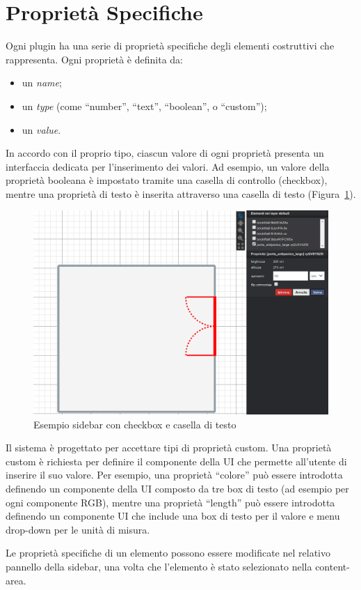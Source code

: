 \section{Propriet\`a Specifiche}
\label{sec:chapter_3_section_3}

\noindent

Ogni plugin ha una serie di proprietà specifiche degli elementi costruttivi che rappresenta.
Ogni propriet\`a \`e definita da:
\begin{itemize}
  \item un \emph{name};
  \item un \emph{type} (come ``number'', ``text'', ``boolean'', o ``custom'');
  \item un \emph{value}.
\end{itemize}
In accordo con il proprio tipo, ciascun valore di ogni proprietà presenta un interfaccia dedicata per l'inserimento dei valori.
Ad esempio, un valore della proprietà booleana è impostato tramite una casella di controllo (checkbox),
mentre una proprietà di testo è inserita attraverso una casella di testo (Figura~\ref{fig:dettaglio}).

\begin{figure}[htbp] %
   \centering
   \includegraphics[width=1\linewidth]{images/dettaglio}
   \caption{Esempio sidebar con checkbox e casella di testo}
   \label{fig:dettaglio}
   \end{figure}
\newpage

Il sistema \`e progettato per accettare tipi di propriet\`a custom. Una propriet\`a custom è richiesta per definire
il componente della UI che permette all'utente di inserire il suo valore.
Per esempio, una propriet\`a ``colore'' pu\`o essere introdotta definendo un componente della UI composto da tre box di testo
(ad esempio per ogni componente RGB), mentre una propriet\`a ``length'' pu\`o essere introdotta definendo un componente UI
che include una box di testo per il valore e menu drop-down per le unità di misura.

Le propriet\`a specifiche di un elemento possono essere modificate nel relativo pannello della sidebar, una volta che l'elemento
\`e stato selezionato nella content-area.

